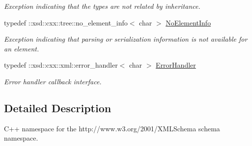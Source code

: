 \begin{DoxyCompactItemize}
\begin{DoxyCompactList}\small\item\em Exception indicating that the types are not related by inheritance. \item\end{DoxyCompactList}\item 
\hypertarget{namespacexml__schema_a1e727485a1944aba45cfc01c4510bb97}{
typedef ::xsd::cxx::tree::no\_\-element\_\-info$<$ char $>$ \hyperlink{namespacexml__schema_a1e727485a1944aba45cfc01c4510bb97}{NoElementInfo}}
\label{namespacexml__schema_a1e727485a1944aba45cfc01c4510bb97}

\begin{DoxyCompactList}\small\item\em Exception indicating that parsing or serialization information is not available for an element. \item\end{DoxyCompactList}\item 
\hypertarget{namespacexml__schema_ab1c9361bfd3b404eaabf0c31eded79dc}{
typedef ::xsd::cxx::xml::error\_\-handler$<$ char $>$ \hyperlink{namespacexml__schema_ab1c9361bfd3b404eaabf0c31eded79dc}{ErrorHandler}}
\label{namespacexml__schema_ab1c9361bfd3b404eaabf0c31eded79dc}

\begin{DoxyCompactList}\small\item\em Error handler callback interface. \item\end{DoxyCompactList}\end{DoxyCompactItemize}


\subsection{Detailed Description}
C++ namespace for the http://www.w3.org/2001/XMLSchema schema namespace. 
